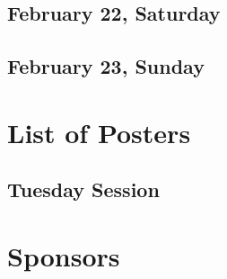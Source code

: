 \documentclass[openany, parskip=full, 12pt, a4]{scrbook}
\begin{document}



\vfill

\section{February 22, Saturday}






\vfill

\section{February 23, Sunday}








\chapter{List of Posters} 

\vspace{-2.5em}

\section{Tuesday Session}




 
% 
 

% 

\chapter{Sponsors}



\newpage


\pagecolor{myblue}
\thispagestyle{empty}
\mbox{}
\end{document}
